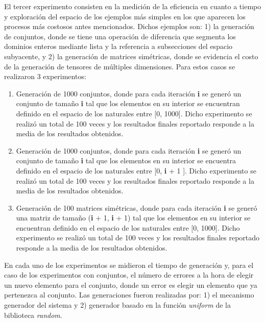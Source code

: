El tercer experimento consisten en la medición de la eficiencia en cuanto a tiempo y exploración
del espacio de los ejemplos más simples en los que aparecen los procesos más costosos antes
mencionados. Dichos ejemplos son: 1) la generación de conjuntos, donde se tiene una operación de
diferencia que segmenta los dominios enteros mediante lista y la referencia a subsecciones del
espacio subyacente, y 2) la generación de matrices simétricas, donde se evidencia el costo de
la generación de tensores de múltiples dimensiones. Para estos casos se realizaron 3 experimentos:
\begin{enumerate}
      \item Generación de 1000 conjuntos, donde para cada iteración {\bf i} se generó un conjunto de tamaño {\bf i}
            tal que los elementos en su interior se encuentran definido en el espacio de los naturales entre
                  [0, 1000]. Dicho experimento se realizó un total de 100 veces y los resultados finales reportado
            responde a la media de los resultados obtenidos.
      \item Generación de 1000 conjuntos, donde para cada iteración {\bf i} se generó un conjunto de tamaño {\bf i}
            tal que los elementos en su interior se encuentra definido en el espacio de los naturales entre
                  [0, {\bf i} + 1 ]. Dicho experimento se realizó un total de 100 veces y los resultados finales reportado
            responde a la media de los resultados obtenidos.
      \item Generación de 100 matrices simétricas, donde para cada iteración {\bf i} se generó una matriz de
            tamaño ({\bf i} + 1, {\bf i} + 1) tal que los elementos en su interior se encuentran definido en el espacio de los
            naturales entre [0, 1000]. Dicho experimento se realizó un total de 100 veces y los resultados
            finales reportado responde a la media de los resultados obtenidos.
\end{enumerate}


En cada uno de los experimentos se midieron el tiempo de generación y, para el caso de los experimentos
con conjuntos, el número de errores a la hora de elegir un nuevo elemento para el conjunto, donde un error
es elegir un elemento que ya pertenezca al conjunto. Las generaciones fueron realizadas por: 1) el
mecanismo generador del sistema y 2) generador basado en la función {\it uniform} de la biblioteca {\it random}.


